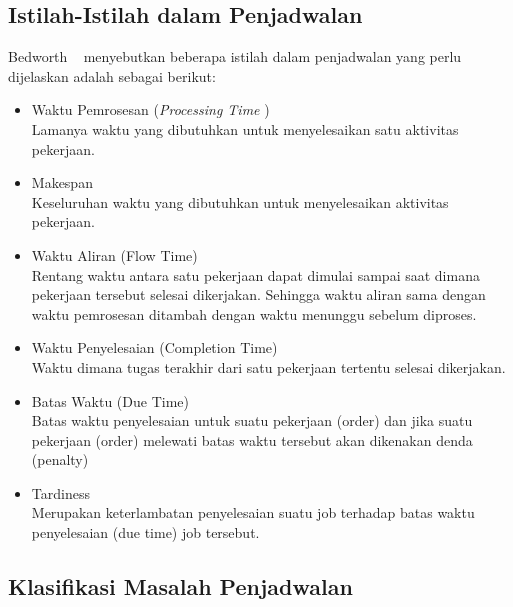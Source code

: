 \subsection{Istilah-Istilah dalam Penjadwalan}
Bedworth ~\cite{Bedworth:1999:IPC:554704} menyebutkan beberapa istilah dalam penjadwalan yang perlu dijelaskan adalah sebagai berikut:
 \begin{itemize}
 	\item Waktu Pemrosesan ({\it Processing Time }) \\
 	Lamanya waktu yang dibutuhkan untuk menyelesaikan satu aktivitas pekerjaan.
 	\item Makespan \\
 	Keseluruhan waktu yang dibutuhkan untuk menyelesaikan aktivitas pekerjaan.
 	\item Waktu Aliran (Flow Time) \\
 	Rentang waktu antara satu pekerjaan dapat dimulai sampai saat dimana pekerjaan tersebut selesai dikerjakan. Sehingga waktu aliran sama dengan waktu pemrosesan ditambah dengan waktu menunggu sebelum diproses.
	\item Waktu Penyelesaian (Completion Time)\\
	Waktu dimana tugas terakhir dari satu pekerjaan tertentu selesai dikerjakan.
	\item Batas Waktu (Due Time)\\
	Batas waktu penyelesaian untuk suatu pekerjaan (order) dan jika suatu pekerjaan (order)
	melewati batas waktu tersebut akan dikenakan denda (penalty)
	\item Tardiness \\
	Merupakan keterlambatan penyelesaian suatu job  terhadap batas waktu penyelesaian (due time) job tersebut.
 	
 \end{itemize}

\subsection{Klasifikasi Masalah Penjadwalan}

